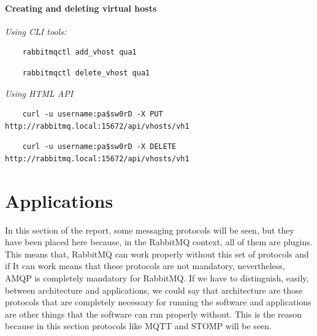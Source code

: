 \documentclass[12pt]{article}
\begin{document}
\paragraph*{Creating and deleting virtual hosts\\}
\textit{Using CLI tools:\\}
\begin{lstlisting}
    rabbitmqctl add_vhost qua1
\end{lstlisting}

\begin{lstlisting}
    rabbitmqctl delete_vhost qua1
\end{lstlisting}

\textit{Using HTML API\\}
\begin{lstlisting}
    curl -u username:pa$sw0rD -X PUT http://rabbitmq.local:15672/api/vhosts/vh1
\end{lstlisting}

\begin{lstlisting}
    curl -u username:pa$sw0rD -X DELETE http://rabbitmq.local:15672/api/vhosts/vh1
\end{lstlisting}

\section*{Applications}
In this section of the report, some messaging protocols will be seen, but they have been placed here because, in the RabbitMQ context, all of them are plugins. This means that, RabbitMQ can work properly without this set of protocols and if It can work means that these protocols are not mandatory, nevertheless, AMQP is completely mandatory for RabbitMQ.
If we have to distinguish, easily, between architecture and applications, we could say that architecture are those protocols that are completely necessary for running the software and applications are other things that the software can run properly without. This is the reason because in this section protocols like MQTT and STOMP will be seen.
\end{document}
